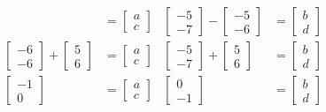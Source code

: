 \documentclass{article}
\begin{document}
\begin{align*}
        &= \begin{bmatrix} a \\ c\end{bmatrix} &
    \begin{bmatrix} -5 \\ -7\end{bmatrix} - \begin{bmatrix} -5 \\ -6\end{bmatrix}
        &= \begin{bmatrix} b \\ d\end{bmatrix} \\
    \begin{bmatrix} -6 \\ -6\end{bmatrix} + \begin{bmatrix} 5 \\ 6\end{bmatrix}
        &= \begin{bmatrix} a \\ c\end{bmatrix} &
    \begin{bmatrix} -5 \\ -7\end{bmatrix} + \begin{bmatrix} 5 \\ 6\end{bmatrix}
        &= \begin{bmatrix} b \\ d\end{bmatrix} \\
    \begin{bmatrix} -1 \\ 0\end{bmatrix}
        &= \begin{bmatrix} a \\ c\end{bmatrix} &
    \begin{bmatrix} 0 \\ -1\end{bmatrix}
        &= \begin{bmatrix} b \\ d\end{bmatrix} \\
\end{align*}
\end{document}

